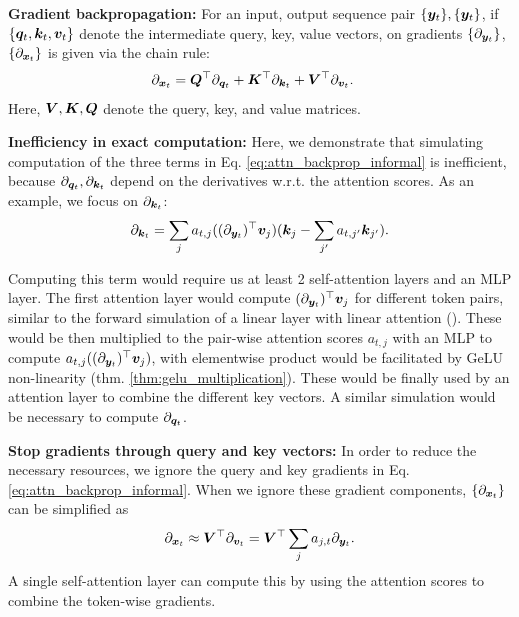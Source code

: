 \textbf{Gradient backpropagation:}
For an input, output sequence pair $\{{\bm{y}}_t\}, \{{\bm{y}}_t\}$, if $\{{\bm{q}}_t, {\bm{k}}_t, {\bm{v}}_t\}$ denote the intermediate query, key, value vectors, on gradients $\{ \partial_{{\bm{y}}_t} \}$, $\{ \partial_{{\bm{x}}_t} \}$ is given via the chain rule:
\begin{align}
    \partial_{{\bm{x}}_t} &= {\bm{Q}}^{\top} \partial_{{\bm{q}}_t} + {\bm{K}}^{\top} \partial_{{\bm{k}}_t} + {\bm{V}}^{\top} \partial_{{\bm{v}}_t}.
    \label{eq:attn_backprop_informal}
\end{align}
Here, ${\bm{V}}, {\bm{K}}, {\bm{Q}}$ denote the query, key, and value matrices. 

\textbf{Inefficiency in exact computation:} 
Here, we demonstrate that simulating computation of the three terms in Eq. \ref{eq:attn_backprop_informal} is inefficient, because
$\partial_{{\bm{q}}_t}, \partial_{{\bm{k}}_t}$ depend on the derivatives w.r.t. the attention scores. 
As an example, we focus on $\partial_{{\bm{k}}_t}$:
\begin{align*}
    \partial_{{\bm{k}}_t} = \sum_j a_{t, j} ( (\partial_{{\bm{y}}_t})^{\top} {\bm{v}}_j ) ({\bm{k}}_j - \sum_{j'} a_{t, j'} {\bm{k}}_{j'}).
\end{align*}

Computing this term would require us at least 2 self-attention layers and an MLP layer. The first attention layer would compute $(\partial_{{\bm{y}}_t})^{\top} {\bm{v}}_j$ for different token pairs, similar to the forward simulation of a linear layer with linear attention (\textsection{\ref{sec:exposition_linear_forward}}). These would be then multiplied to the pair-wise attention scores $a_{t, j}$  with an MLP to compute $a_{t, j} ( (\partial_{{\bm{y}}_t})^{\top} {\bm{v}}_j )$, with elementwise product would be facilitated by GeLU non-linearity (thm. \ref{thm:gelu_multiplication}). 
These would be finally used by an attention layer to combine the different key vectors. A similar simulation would be necessary to compute $\partial_{{\bm{q}}_t}$.




\textbf{Stop gradients through query and key vectors:}
In order to reduce the necessary resources, we ignore the query and key gradients in Eq. \ref{eq:attn_backprop_informal}. When we ignore these gradient components,  $\{ \partial_{{\bm{x}}_t} \}$ can be simplified as
\begin{align}
    \partial_{{\bm{x}}_t} \approx {\bm{V}}^{\top} \partial_{{\bm{v}}_t} = {\bm{V}}^{\top} \sum_{j} a_{j, t} \partial_{{\bm{y}}_t}.
    \label{eq:approx_attn_gradient}
\end{align}
A single self-attention layer can compute this by using the attention scores to combine the token-wise gradients.

